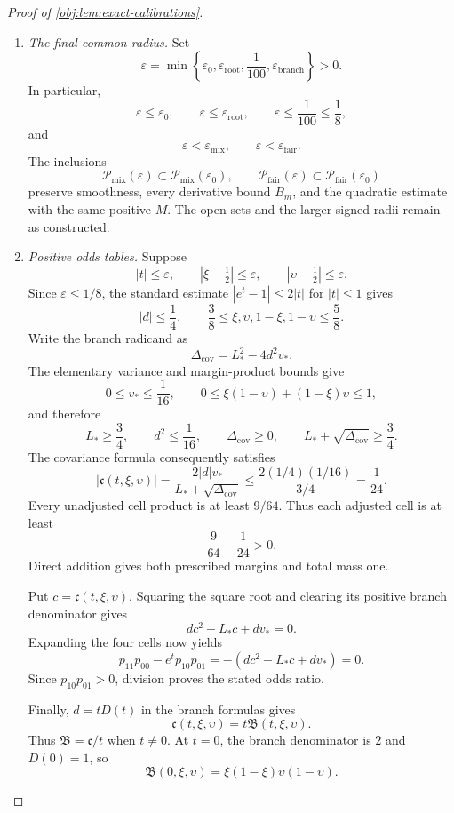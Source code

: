 \begin{proof}[Proof of \cref{obj:lem:exact-calibrations}]
\begin{enumerate}
\item \emph{The final common radius.}
Set
\[
\varepsilon
=
\min\left\{
\varepsilon_0,\varepsilon_{\mathrm{root}},
\frac1{100},\varepsilon_{\mathrm{branch}}
\right\}>0.
\]
In particular,
\[
\varepsilon\le\varepsilon_0,\qquad
\varepsilon\le\varepsilon_{\mathrm{root}},\qquad
\varepsilon\le\frac1{100}\le\frac18,
\]
and
\[
\varepsilon<\varepsilon_{\mathrm{mix}},
\qquad
\varepsilon<\varepsilon_{\mathrm{fair}}.
\]
The inclusions
\[
\mathcal P_{\mathrm{mix}}(\varepsilon)
\subset\mathcal P_{\mathrm{mix}}(\varepsilon_0),
\qquad
\mathcal P_{\mathrm{fair}}(\varepsilon)
\subset\mathcal P_{\mathrm{fair}}(\varepsilon_0)
\]
preserve smoothness, every derivative bound \(B_m\), and the quadratic estimate with the same positive \(M\). The open sets and the larger signed radii remain as constructed.

\item \emph{Positive odds tables.}
Suppose
\[
|t|\le\varepsilon,\qquad
|\xi-\tfrac12|\le\varepsilon,\qquad
|\upsilon-\tfrac12|\le\varepsilon.
\]
Since \(\varepsilon\le1/8\), the standard estimate
\(|e^t-1|\le2|t|\) for \(|t|\le1\) gives
\[
|d|\le\frac14,\qquad
\frac38\le\xi,\upsilon,1-\xi,1-\upsilon\le\frac58.
\]
Write the branch radicand as
\[
\Delta_{\mathrm{cov}}=L_*^2-4d^2v_*.
\]
The elementary variance and margin-product bounds give
\[
0\le v_*\le\frac1{16},
\qquad
0\le\xi(1-\upsilon)+(1-\xi)\upsilon\le1,
\]
and therefore
\[
L_*\ge\frac34,\qquad
d^2\le\frac1{16},\qquad
\Delta_{\mathrm{cov}}\ge0,\qquad
L_*+\sqrt{\Delta_{\mathrm{cov}}}\ge\frac34.
\]
The covariance formula consequently satisfies
\[
|\mathfrak c(t,\xi,\upsilon)|
=
\frac{2|d|v_*}{L_*+\sqrt{\Delta_{\mathrm{cov}}}}
\le
\frac{2(1/4)(1/16)}{3/4}
=\frac1{24}.
\]
Every unadjusted cell product is at least \(9/64\). Thus each adjusted cell is at least
\[
\frac9{64}-\frac1{24}>0.
\]
Direct addition gives both prescribed margins and total mass one.

Put \(c=\mathfrak c(t,\xi,\upsilon)\). Squaring the square root and clearing its positive branch denominator gives
\[
dc^2-L_*c+dv_*=0.
\]
Expanding the four cells now yields
\[
p_{11}p_{00}-e^t p_{10}p_{01}
=-(dc^2-L_*c+dv_*)=0.
\]
Since \(p_{10}p_{01}>0\), division proves the stated odds ratio.

Finally, \(d=tD(t)\) in the branch formulas gives
\[
\mathfrak c(t,\xi,\upsilon)=t\mathfrak B(t,\xi,\upsilon).
\]
Thus \(\mathfrak B=\mathfrak c/t\) when \(t\ne0\). At \(t=0\), the branch denominator is \(2\) and \(D(0)=1\), so
\[
\mathfrak B(0,\xi,\upsilon)
=\xi(1-\xi)\upsilon(1-\upsilon).
\]


\end{enumerate}
\end{proof}
